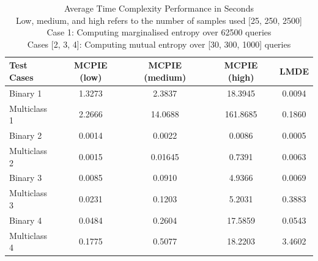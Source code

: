 



		\begin{table}[h]
			\begin{center}
				\begin{tabular}{ l c c c c }
					\hline
					\hline
					Test Cases & MCPIE (low) & MCPIE (medium) & MCPIE (high) & LMDE \\
					\hline
					\hline
					Binary 1 & 1.3273 & 2.3837 & 18.3945 & 0.0094 \\
					Multiclass 1 & 2.2666 & 14.0688 & 161.8685 & 0.1860 \\
					Binary 2 & 0.0014 & 0.0022 & 0.0086 & 0.0005 \\
					Multiclass 2 & 0.0015 & 0.01645 & 0.7391 & 0.0063 \\
					Binary 3 & 0.0085 & 0.0910 & 4.9366 & 0.0069 \\
					Multiclass 3 & 0.0231 & 0.1203 & 5.2031 & 0.3883 \\
					Binary 4 & 0.0484 & 0.2604 & 17.5859 & 0.0543 \\
					Multiclass 4 & 0.1775 & 0.5077 & 18.2203 & 3.4602 \\
					\hline
					\hline
				\end{tabular}
			\end{center}
	  	\caption{Average Time Complexity Performance in Seconds \\ Low, medium, and high refers to the number of samples used [25, 250, 2500] \\ Case 1: Computing marginalised entropy over 62500 queries \\ Cases [2, 3, 4]: Computing mutual entropy over [30, 300, 1000] queries}
	  	\label{Table:TimeComplexity}			
	  	\end{table}	
	  	
